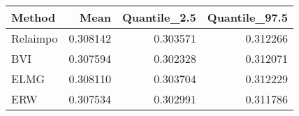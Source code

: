 \begin{table}[ht]
\centering
\begin{tabular}{lrrr}
  \hline
Method & Mean & Quantile\_2.5 & Quantile\_97.5 \\ 
  \hline
Relaimpo & 0.308142 & 0.303571 & 0.312266 \\ 
  BVI & 0.307594 & 0.302328 & 0.312071 \\ 
  ELMG & 0.308110 & 0.303704 & 0.312229 \\ 
  ERW & 0.307534 & 0.302991 & 0.311786 \\ 
   \hline
\end{tabular}
\end{table}
